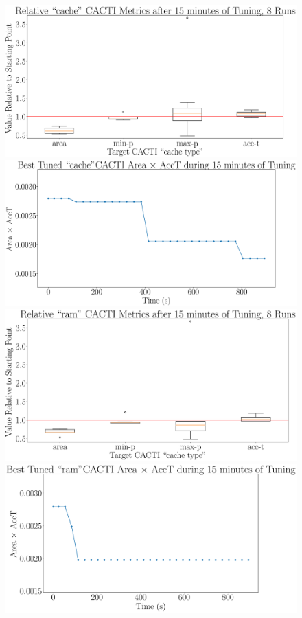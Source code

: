 \documentclass[12pt, a4paper]{article}
\begin{document}
\begin{figure}[htpb]
    \centering
    \begin{minipage}{.48\textwidth}
        \centering
        \includegraphics[width=.8\textwidth]{target_area_times_acct_900_cache}
    \end{minipage}%
    \begin{minipage}{.48\textwidth}
        \centering
        \includegraphics[width=.8\textwidth]{target_area_times_acct_900_cache_best}
    \end{minipage}%

    \begin{minipage}{.48\textwidth}
        \centering
        \includegraphics[width=.8\textwidth]{target_area_times_acct_900_ram}
    \end{minipage}%
    \begin{minipage}{.48\textwidth}
        \centering
        \includegraphics[width=.8\textwidth]{target_area_times_acct_900_ram_best}
    \end{minipage}%


\end{figure}
\end{document}
